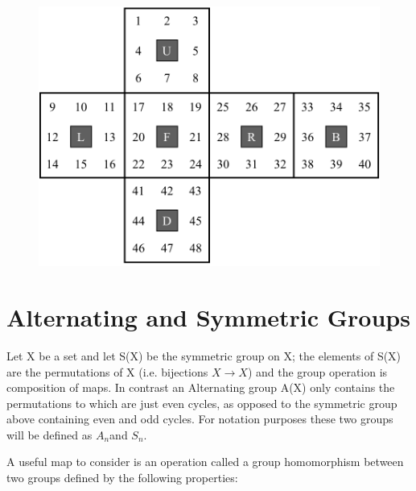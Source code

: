 \documentclass{article}
\begin{document}
\begin{figure}[hbt]
\includegraphics[scale=.24]{numbercube.png}
\label{fig:labelled}
\end{figure}
\newpage
\section{Alternating and Symmetric Groups}
Let X be a set and let S(X) be the symmetric group on X; the elements of S(X)
are the permutations of X (i.e. bijections $X\rightarrow X$) and the group operation is
composition of maps.
In contrast an Alternating group A(X) only contains the permutations to which are just even cycles, as opposed to the symmetric group above containing even and odd cycles.  For notation purposes these two groups will be defined as $A_{n} $and $S_{n}$. 



A useful map to consider is an operation called a group homomorphism between two groups defined by the following properties:
\end{document}
